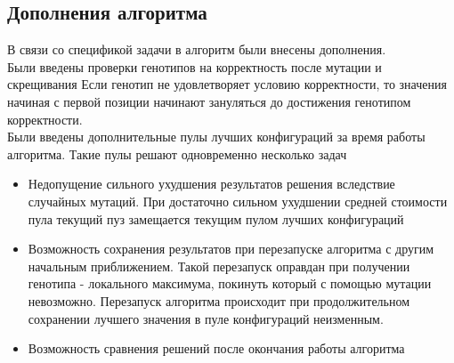 \subsection{Дополнения алгоритма}
В связи со спецификой задачи в алгоритм были внесены дополнения. 
\\Были введены проверки генотипов на корректность после мутации и скрещивания Если генотип не удовлетворяет условию корректности, то значения начиная с первой позиции начинают зануляться до достижения генотипом корректности. 
\\Были введены дополнительные пулы лучших конфигураций за время работы алгоритма. Такие пулы решают одновременно несколько задач 
\begin{itemize}
 \item Недопущение сильного ухудшения результатов решения вследствие случайных мутаций. При достаточно сильном ухудшении средней стоимости пула текущий пуз замещается текущим пулом лучших конфигураций 
 \item Возможность сохранения результатов при перезапуске алгоритма с другим начальным приближением. Такой перезапуск оправдан при получении генотипа - локального максимума, покинуть который с помощью мутации невозможно. Перезапуск алгоритма происходит при продолжительном сохранении лучшего значения в пуле конфигураций неизменным.
 \item Возможность сравнения решений после окончания работы алгоритма
\end{itemize}